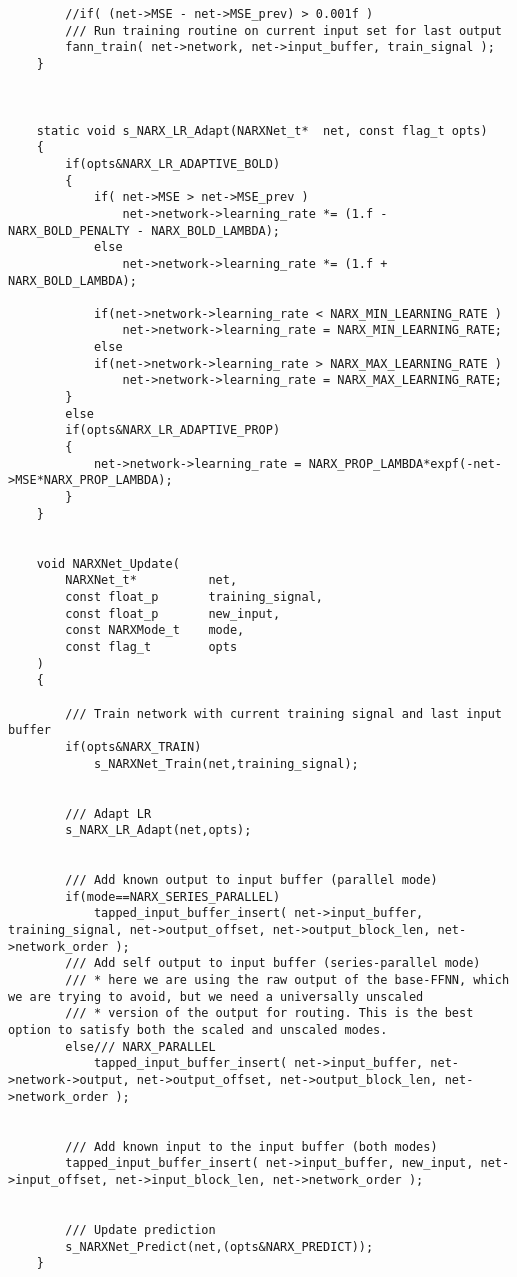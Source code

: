 \begin{lstlisting}
		//if( (net->MSE - net->MSE_prev) > 0.001f )
		/// Run training routine on current input set for last output
		fann_train( net->network, net->input_buffer, train_signal );
	}



	static void s_NARX_LR_Adapt(NARXNet_t*	net, const flag_t opts)
	{
		if(opts&NARX_LR_ADAPTIVE_BOLD)
		{
			if( net->MSE > net->MSE_prev )
				net->network->learning_rate *= (1.f - NARX_BOLD_PENALTY - NARX_BOLD_LAMBDA);
			else
				net->network->learning_rate *= (1.f + NARX_BOLD_LAMBDA);

			if(net->network->learning_rate < NARX_MIN_LEARNING_RATE )
				net->network->learning_rate = NARX_MIN_LEARNING_RATE;
			else
			if(net->network->learning_rate > NARX_MAX_LEARNING_RATE )
				net->network->learning_rate = NARX_MAX_LEARNING_RATE;
		}
		else
		if(opts&NARX_LR_ADAPTIVE_PROP)
		{
			net->network->learning_rate = NARX_PROP_LAMBDA*expf(-net->MSE*NARX_PROP_LAMBDA);
		}
	}


	void NARXNet_Update(
		NARXNet_t*			net,
		const float_p		training_signal,
		const float_p		new_input,
		const NARXMode_t	mode,
		const flag_t		opts
	)
	{

		/// Train network with current training signal and last input buffer
		if(opts&NARX_TRAIN)
			s_NARXNet_Train(net,training_signal);


		/// Adapt LR
		s_NARX_LR_Adapt(net,opts);


		/// Add known output to input buffer (parallel mode)
		if(mode==NARX_SERIES_PARALLEL)
			tapped_input_buffer_insert( net->input_buffer, training_signal, net->output_offset, net->output_block_len, net->network_order );
		/// Add self output to input buffer (series-parallel mode)
		/// * here we are using the raw output of the base-FFNN, which we are trying to avoid, but we need a universally unscaled
		/// * version of the output for routing. This is the best option to satisfy both the scaled and unscaled modes.
		else/// NARX_PARALLEL
			tapped_input_buffer_insert( net->input_buffer, net->network->output, net->output_offset, net->output_block_len, net->network_order );


		/// Add known input to the input buffer (both modes)
		tapped_input_buffer_insert( net->input_buffer, new_input, net->input_offset, net->input_block_len, net->network_order );


		/// Update prediction
		s_NARXNet_Predict(net,(opts&NARX_PREDICT));
	}

\end{lstlisting}

